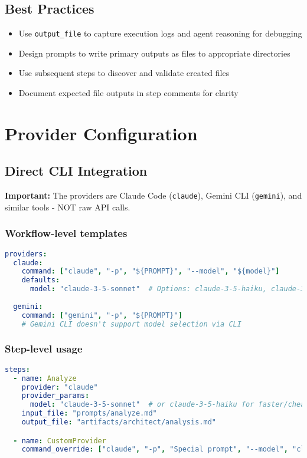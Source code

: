 \documentclass[11pt,a4paper]{article}
\begin{document}
\subsection{Best Practices}

\begin{itemize}
    \item Use \texttt{output\_file} to capture execution logs and agent reasoning for debugging
    \item Design prompts to write primary outputs as files to appropriate directories
    \item Use subsequent steps to discover and validate created files
    \item Document expected file outputs in step comments for clarity
\end{itemize}

\section{Provider Configuration}

\subsection{Direct CLI Integration}

\textbf{Important:} The providers are Claude Code (\texttt{claude}), Gemini CLI (\texttt{gemini}), and similar tools - NOT raw API calls.

\subsubsection{Workflow-level templates}

\begin{lstlisting}[language=yaml, caption={Provider Configuration}]
providers:
  claude:
    command: ["claude", "-p", "${PROMPT}", "--model", "${model}"]
    defaults:
      model: "claude-3-5-sonnet"  # Options: claude-3-5-haiku, claude-3-opus-latest
  
  gemini:
    command: ["gemini", "-p", "${PROMPT}"]
    # Gemini CLI doesn't support model selection via CLI
\end{lstlisting}

\subsubsection{Step-level usage}

\begin{lstlisting}[language=yaml, caption={Step-level Provider Usage}]
steps:
  - name: Analyze
    provider: "claude"
    provider_params:
      model: "claude-3-5-sonnet"  # or claude-3-5-haiku for faster/cheaper
    input_file: "prompts/analyze.md"
    output_file: "artifacts/architect/analysis.md"

  - name: CustomProvider
    command_override: ["claude", "-p", "Special prompt", "--model", "claude-3-5-haiku"]
\end{lstlisting}
\end{document}

